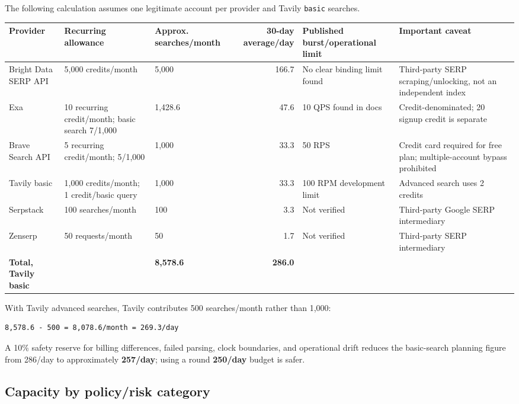 \documentclass[11pt]{article}
\begin{document}
The following calculation assumes one legitimate account per provider and
Tavily \texttt{basic} searches.

\begin{center}
\begin{tabular}{lllrll}
Provider & Recurring allowance & Approx. searches/month & 30-day average/day & Published burst/operational limit & Important caveat\\
\hline
Bright Data SERP API & 5,000 credits/month & 5,000 & 166.7 & No clear binding limit found & Third-party SERP scraping/unlocking, not an independent index\\
Exa & \char36{}10 recurring credit/month; basic search \char36{}7/1,000 & 1,428.6 & 47.6 & 10 QPS found in docs & Credit-denominated; \char36{}20 signup credit is separate\\
Brave Search API & \char36{}5 recurring credit/month; \char36{}5/1,000 & 1,000 & 33.3 & 50 RPS & Credit card required for free plan; multiple-account bypass prohibited\\
Tavily basic & 1,000 credits/month; 1 credit/basic query & 1,000 & 33.3 & 100 RPM development limit & Advanced search uses 2 credits\\
Serpstack & 100 searches/month & 100 & 3.3 & Not verified & Third-party Google SERP intermediary\\
Zenserp & 50 requests/month & 50 & 1.7 & Not verified & Third-party SERP intermediary\\
\hline
\textbf{Total, Tavily basic} &  & \textbf{8,578.6} & \textbf{286.0} &  & \\
\end{tabular}
\end{center}

With Tavily advanced searches, Tavily contributes 500 searches/month rather
than 1,000:

\begin{verbatim}
8,578.6 - 500 = 8,078.6/month = 269.3/day
\end{verbatim}

A 10\% safety reserve for billing differences, failed parsing, clock boundaries,
and operational drift reduces the basic-search planning figure from 286/day to
approximately \textbf{257/day}; using a round \textbf{250/day} budget is safer.
\subsection*{Capacity by policy/risk category}
\label{sec:orga478027}
\end{document}
